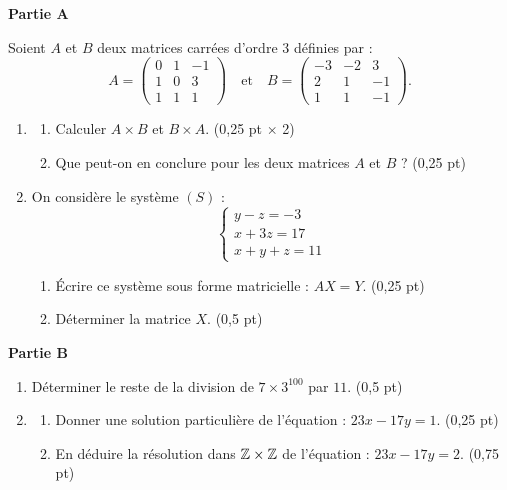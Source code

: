 




\noindent\textbf{Partie A}

Soient $A$ et $B$ deux matrices carrées d'ordre $3$ définies par :
$$
A = \begin{pmatrix} 0 & 1 & -1 \\ 1 & 0 & 3 \\ 1 & 1 & 1 \end{pmatrix}
\quad \text{et} \quad
B = \begin{pmatrix} -3 & -2 & 3 \\ 2 & 1 & -1 \\ 1 & 1 & -1 \end{pmatrix}.
$$

\begin{enumerate}
	\item
	\begin{enumerate}
		\item Calculer $A \times B$ et $B \times A$. \hfill (0,25 pt $\times$ 2)
		\item Que peut-on en conclure pour les deux matrices $A$ et $B$ ? \hfill (0,25 pt)
	\end{enumerate}
	\item On considère le système $(S)$ :
	$$
	\begin{cases}
		y - z = -3 \\
		x + 3z = 17 \\
		x + y + z = 11
	\end{cases}
	$$
	\begin{enumerate}
		\item Écrire ce système sous forme matricielle : $AX = Y$. \hfill (0,25 pt)
		\item Déterminer la matrice $X$. \hfill (0,5 pt)
	\end{enumerate}
\end{enumerate}

\bigskip

\noindent\textbf{Partie B}

\begin{enumerate}
	\item Déterminer le reste de la division de $7 \times 3^{100}$ par $11$. \hfill (0,5 pt)
	\item
	\begin{enumerate}
		\item Donner une solution particulière de l'équation : $23x - 17y = 1$. \hfill (0,25 pt)
		\item En déduire la résolution dans $\mathbb{Z} \times \mathbb{Z}$ de l'équation : $23x - 17y = 2$. \hfill (0,75 pt)
	\end{enumerate}
\end{enumerate}


